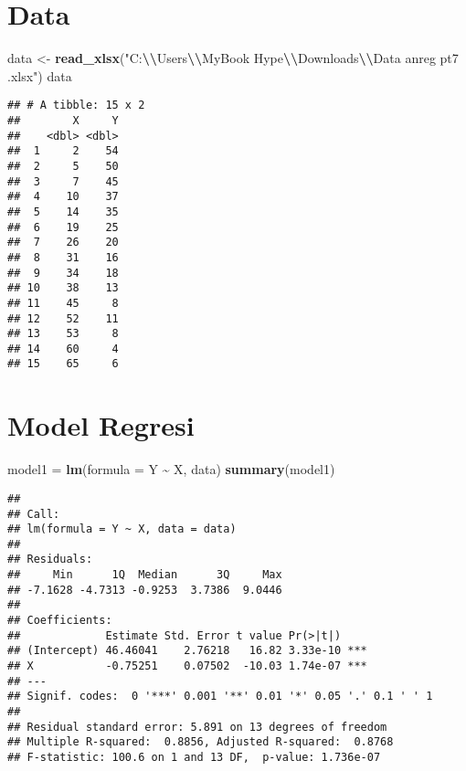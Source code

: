 \documentclass[
]{article}
\newenvironment{Shaded}{\begin{snugshade}}{\end{snugshade}}
\newcommand{\AttributeTok}[1]{\textcolor[rgb]{0.13,0.29,0.53}{#1}}
\newcommand{\FunctionTok}[1]{\textcolor[rgb]{0.13,0.29,0.53}{\textbf{#1}}}
\newcommand{\NormalTok}[1]{#1}
\newcommand{\OtherTok}[1]{\textcolor[rgb]{0.56,0.35,0.01}{#1}}
\newcommand{\SpecialCharTok}[1]{\textcolor[rgb]{0.81,0.36,0.00}{\textbf{#1}}}
\newcommand{\StringTok}[1]{\textcolor[rgb]{0.31,0.60,0.02}{#1}}
\begin{document}
\hypertarget{data}{%
\section{Data}\label{data}}

\begin{Shaded}
\begin{Highlighting}[]
\NormalTok{data }\OtherTok{\textless{}{-}} \FunctionTok{read\_xlsx}\NormalTok{(}\StringTok{"C:}\SpecialCharTok{\textbackslash{}\textbackslash{}}\StringTok{Users}\SpecialCharTok{\textbackslash{}\textbackslash{}}\StringTok{MyBook Hype}\SpecialCharTok{\textbackslash{}\textbackslash{}}\StringTok{Downloads}\SpecialCharTok{\textbackslash{}\textbackslash{}}\StringTok{Data anreg pt7 .xlsx"}\NormalTok{)}
\NormalTok{data}
\end{Highlighting}
\end{Shaded}

\begin{verbatim}
## # A tibble: 15 x 2
##        X     Y
##    <dbl> <dbl>
##  1     2    54
##  2     5    50
##  3     7    45
##  4    10    37
##  5    14    35
##  6    19    25
##  7    26    20
##  8    31    16
##  9    34    18
## 10    38    13
## 11    45     8
## 12    52    11
## 13    53     8
## 14    60     4
## 15    65     6
\end{verbatim}

\hypertarget{model-regresi}{%
\section{Model Regresi}\label{model-regresi}}

\begin{Shaded}
\begin{Highlighting}[]
\NormalTok{model1 }\OtherTok{=} \FunctionTok{lm}\NormalTok{(}\AttributeTok{formula =}\NormalTok{ Y }\SpecialCharTok{\textasciitilde{}}\NormalTok{ X, data)}
\FunctionTok{summary}\NormalTok{(model1)}
\end{Highlighting}
\end{Shaded}

\begin{verbatim}
## 
## Call:
## lm(formula = Y ~ X, data = data)
## 
## Residuals:
##     Min      1Q  Median      3Q     Max 
## -7.1628 -4.7313 -0.9253  3.7386  9.0446 
## 
## Coefficients:
##             Estimate Std. Error t value Pr(>|t|)    
## (Intercept) 46.46041    2.76218   16.82 3.33e-10 ***
## X           -0.75251    0.07502  -10.03 1.74e-07 ***
## ---
## Signif. codes:  0 '***' 0.001 '**' 0.01 '*' 0.05 '.' 0.1 ' ' 1
## 
## Residual standard error: 5.891 on 13 degrees of freedom
## Multiple R-squared:  0.8856, Adjusted R-squared:  0.8768 
## F-statistic: 100.6 on 1 and 13 DF,  p-value: 1.736e-07
\end{verbatim}
\end{document}

